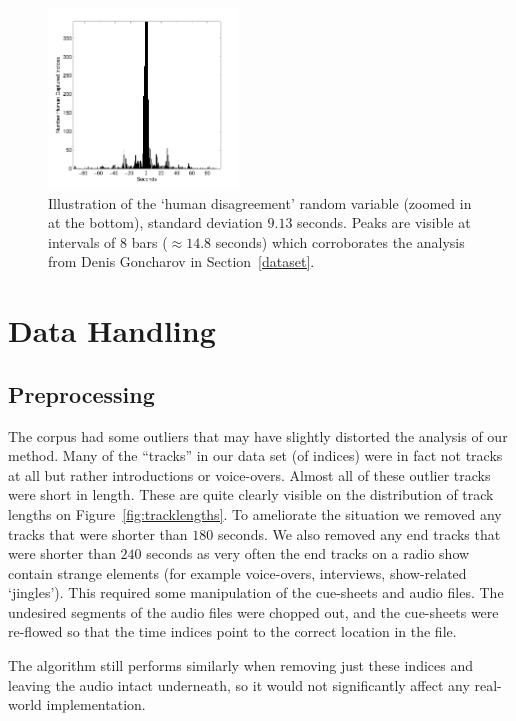 \documentclass[twocolumn]{article}
\begin{document}
	\begin{figure}
		\centering
		\includegraphics[width=0.45\textwidth]{images/human_confusion}
		
		\caption{Illustration of the `human disagreement' random variable (zoomed in at the bottom), standard deviation $9.13$ seconds. Peaks are visible at intervals of $8$ bars ($\approx 14.8$ seconds) which corroborates the analysis from Denis Goncharov in Section~\ref{dataset}. }
		\label{fig:human_muchconfuse}
	\end{figure} 
	
	\section{Data Handling}
	
	\subsection{Preprocessing}\label{proprocessing} %
	
	The corpus had some outliers that may have slightly distorted the analysis of our method. Many of the ``tracks'' in our data set (of indices) were in fact not tracks at all but rather introductions or voice-overs. Almost all of these outlier tracks were short in length. These are quite clearly visible on the distribution of track lengths on Figure~\ref{fig:tracklengths}. To ameliorate the situation we removed any tracks that were shorter than $180$ seconds. We also removed any end tracks that were shorter than $240$ seconds as very often the end tracks on a radio show contain strange elements (for example voice-overs, interviews, show-related `jingles'). This required some manipulation of the cue-sheets and audio files. The undesired segments of the audio files were chopped out, and the cue-sheets were re-flowed so that the time indices point to the correct location in the file. 
	
	The algorithm still performs similarly when removing just these indices and leaving the audio intact underneath, so it would not significantly affect any real-world implementation. 
	
\end{document}
